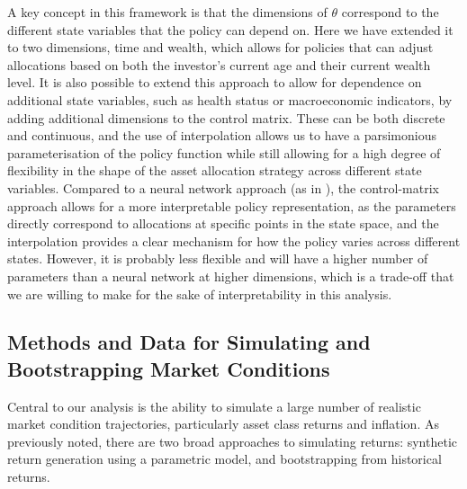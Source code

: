 \documentclass[11pt]{article}
\begin{document}
A key concept in this framework is that the dimensions of \(\theta\) correspond to the different state variables that the policy can depend on. Here we have extended it to two dimensions, time and wealth, which allows for policies that can adjust allocations based on both the investor's current age and their current wealth level. It is also possible to extend this approach to allow for dependence on additional state variables, such as health status or macroeconomic indicators, by adding additional dimensions to the control matrix. These can be both discrete and continuous, and the use of interpolation allows us to have a parsimonious parameterisation of the policy function while still allowing for a high degree of flexibility in the shape of the asset allocation strategy across different state variables. Compared to a neural network approach (as in \textcite{parker2024simple}), the control-matrix approach allows for a more interpretable policy representation, as the parameters directly correspond to allocations at specific points in the state space, and the interpolation provides a clear mechanism for how the policy varies across different states. However, it is probably less flexible and will have a higher number of parameters than a neural network at higher dimensions, which is a trade-off that we are willing to make for the sake of interpretability in this analysis.


\subsection{Methods and Data for Simulating and Bootstrapping Market Conditions}

Central to our analysis is the ability to simulate a large number of realistic market condition trajectories, particularly asset class returns and inflation. As previously noted, there are two broad approaches to simulating returns: synthetic return generation using a parametric model, and bootstrapping from historical returns.
\end{document}
